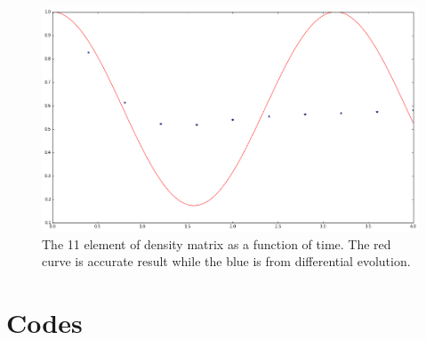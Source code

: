 \documentclass{tufte-handout}
\begin{document}
\begin{figure}
\includegraphics{assets/ann_devo_range}
\caption{The 11 element of density matrix as a function of time. The red curve is accurate result while the blue is from differential evolution.}
\label{fig:ann-DEvo}
\end{figure}






\section{Codes}
\end{document}
